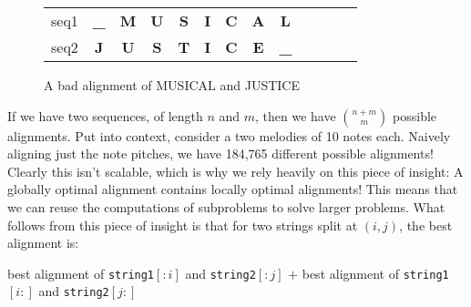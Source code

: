 \begin{figure}[!h]
\centering
\begin{tabular}{lcccccccccccc}
seq1 & {\color[HTML]{009901} \textbf{\_}} & {\color[HTML]{6200C9} \textbf{M}} & {\color[HTML]{6200C9} \textbf{U}} & {\color[HTML]{6200C9} \textbf{S}} & \textbf{I} & \textbf{C} & {\color[HTML]{6200C9} \textbf{A}} & {\color[HTML]{9A0000} \textbf{L}}  & \textbf{} & \textbf{} & \textbf{} &  \\
seq2 & {\color[HTML]{009901} \textbf{J}}  & {\color[HTML]{6200C9} \textbf{U}} & {\color[HTML]{6200C9} \textbf{S}} & {\color[HTML]{6200C9} \textbf{T}} & \textbf{I} & \textbf{C} & {\color[HTML]{6200C9} \textbf{E}} & {\color[HTML]{9A0000} \textbf{\_}} & \textbf{} & \textbf{} & \textbf{} & 
\end{tabular}
\caption{A bad alignment of MUSICAL and JUSTICE}
\label{badalign}
\end{figure}

If we have two sequences, of length $n$ and $m$, then we have $\binom{n+m}{m}$ possible alignments. Put into context, consider a two melodies of 10 notes each. Naively aligning just the note pitches, we have 184,765 different possible alignments! Clearly this isn't scalable, which is why we rely heavily on this piece of insight: A globally optimal alignment contains locally optimal alignments! This means that we can reuse the computations of subproblems to solve larger problems. What follows from this piece of insight is that for two strings split at $(i, j)$, the best alignment is:

\begin{center}
best alignment of \texttt{string1}$[:i]$ and \texttt{string2}$[:j]$ 
$+$ best alignment of \texttt{string1}$[i:]$ and \texttt{string2}$[j:]$
\end{center}


